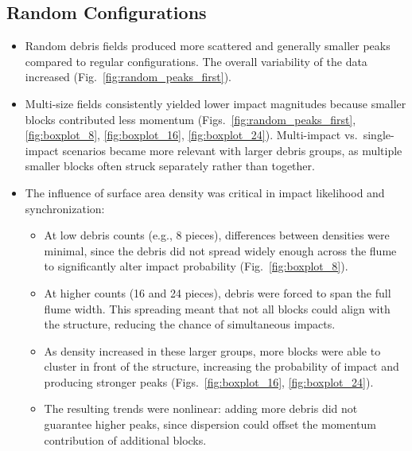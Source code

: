 \documentclass{article}
\begin{document}

\subsection{Random Configurations}
\begin{itemize}
    \item Random debris fields produced more scattered and generally smaller peaks compared to regular configurations. The overall variability of the data increased (Fig.~\ref{fig:random_peaks_first}). 
    \item Multi-size fields consistently yielded lower impact magnitudes because smaller blocks contributed less momentum (Figs.~\ref{fig:random_peaks_first}, \ref{fig:boxplot_8}, \ref{fig:boxplot_16}, \ref{fig:boxplot_24}). Multi-impact vs.\ single-impact scenarios became more relevant with larger debris groups, as multiple smaller blocks often struck separately rather than together.
    \item The influence of surface area density was critical in impact likelihood and synchronization:
    \begin{itemize}
        \item At low debris counts (e.g., 8 pieces), differences between densities were minimal, since the debris did not spread widely enough across the flume to significantly alter impact probability (Fig.~\ref{fig:boxplot_8}).
        \item At higher counts (16 and 24 pieces), debris were forced to span the full flume width. This spreading meant that not all blocks could align with the structure, reducing the chance of simultaneous impacts.
        \item As density increased in these larger groups, more blocks were able to cluster in front of the structure, increasing the probability of impact and producing stronger peaks (Figs.~\ref{fig:boxplot_16}, \ref{fig:boxplot_24}).
        \item The resulting trends were nonlinear: adding more debris did not guarantee higher peaks, since dispersion could offset the momentum contribution of additional blocks.
    \end{itemize}
\end{itemize}
\end{document}
